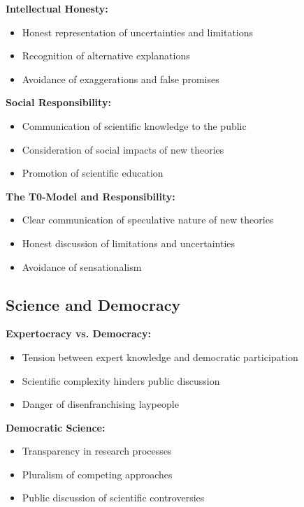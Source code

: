 \documentclass[12pt,a4paper]{report}
\begin{document}
	\textbf{Intellectual Honesty:}
	\begin{itemize}
		\item Honest representation of uncertainties and limitations
		\item Recognition of alternative explanations
		\item Avoidance of exaggerations and false promises
	\end{itemize}
	
	\textbf{Social Responsibility:}
	\begin{itemize}
		\item Communication of scientific knowledge to the public
		\item Consideration of social impacts of new theories
		\item Promotion of scientific education
	\end{itemize}
	
	\textbf{The T0-Model and Responsibility:}
	\begin{itemize}
		\item Clear communication of speculative nature of new theories
		\item Honest discussion of limitations and uncertainties
		\item Avoidance of sensationalism
	\end{itemize}
	
	\subsection{Science and Democracy}\label{subsec:science_democracy}
	
	\textbf{Expertocracy vs. Democracy:}
	\begin{itemize}
		\item Tension between expert knowledge and democratic participation
		\item Scientific complexity hinders public discussion
		\item Danger of disenfranchising laypeople
	\end{itemize}
	
	\textbf{Democratic Science:}
	\begin{itemize}
		\item Transparency in research processes
		\item Pluralism of competing approaches
		\item Public discussion of scientific controversies
	\end{itemize}
	
\end{document}
